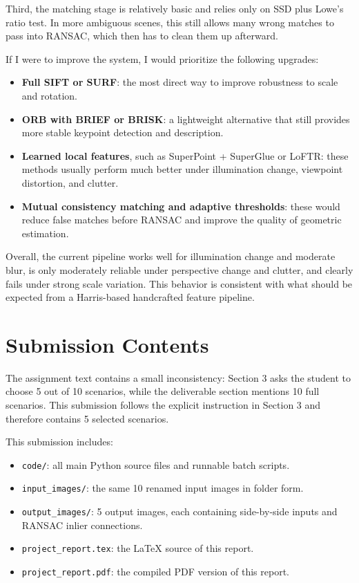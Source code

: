 \documentclass[11pt,a4paper]{article}
\begin{document}
Third, the matching stage is relatively basic and relies only on SSD plus Lowe's ratio test. In more ambiguous scenes, this still allows many wrong matches to pass into RANSAC, which then has to clean them up afterward.

If I were to improve the system, I would prioritize the following upgrades:
\begin{itemize}
    \item \textbf{Full SIFT or SURF}: the most direct way to improve robustness to scale and rotation.
    \item \textbf{ORB with BRIEF or BRISK}: a lightweight alternative that still provides more stable keypoint detection and description.
    \item \textbf{Learned local features}, such as SuperPoint + SuperGlue or LoFTR: these methods usually perform much better under illumination change, viewpoint distortion, and clutter.
    \item \textbf{Mutual consistency matching and adaptive thresholds}: these would reduce false matches before RANSAC and improve the quality of geometric estimation.
\end{itemize}

Overall, the current pipeline works well for illumination change and moderate blur, is only moderately reliable under perspective change and clutter, and clearly fails under strong scale variation. This behavior is consistent with what should be expected from a Harris-based handcrafted feature pipeline.

\section{Submission Contents}
The assignment text contains a small inconsistency: Section 3 asks the student to choose 5 out of 10 scenarios, while the deliverable section mentions 10 full scenarios. This submission follows the explicit instruction in Section 3 and therefore contains 5 selected scenarios.

This submission includes:
\begin{itemize}
    \item \texttt{code/}: all main Python source files and runnable batch scripts.
    \item \texttt{input\_images/}: the same 10 renamed input images in folder form.
    \item \texttt{output\_images/}: 5 output images, each containing side-by-side inputs and RANSAC inlier connections.
    \item \texttt{project\_report.tex}: the LaTeX source of this report.
    \item \texttt{project\_report.pdf}: the compiled PDF version of this report.
\end{itemize}
\end{document}
